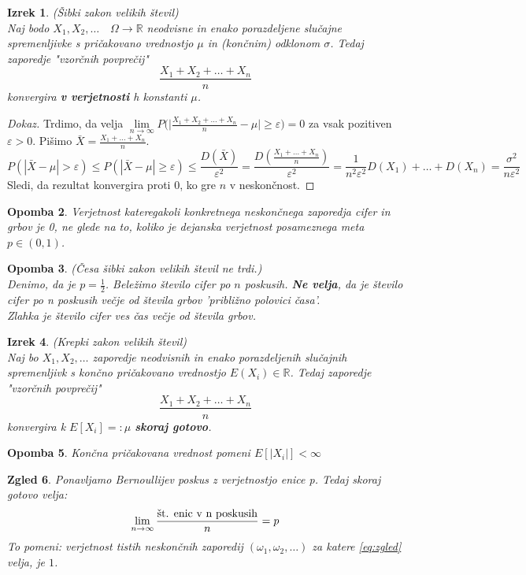 \documentclass[11pt]{article}
\newtheorem{Izrek}{{\sc Izrek}}[section]
\newtheorem{Zgled}[Izrek]{{\sc Zgled}}
\newtheorem{Opomba}[Izrek]{{\sc Opomba}}
\newenvironment{dokaz}[1][{\sc Dokaz}]{\begin{proof}[#1]\renewcommand*{\qedsymbol}{\(\blacksquare\)}}{\end{proof}}
\begin{document}
	\begin{Izrek}\label{izrek:SZVS}
	(Šibki zakon velikih števil)
	\\
	Naj bodo $X_1, X_2, \ldots \quad \Omega \to \mathbb{R}$ neodvisne in enako porazdeljene slučajne spremenljivke s pričakovano vrednostjo $\mu$ in (končnim) odklonom $\sigma$. Tedaj zaporedje "vzorčnih povprečij" 
	$$\frac{X_1 + X_2 + \ldots + X_n}{n}$$
	konvergira \textbf{v verjetnosti} h konstanti $\mu$.
	\end{Izrek}
	\begin{dokaz}
		Trdimo, da velja $\lim\limits_{n \to \infty}{P(|\frac{X_1+X_2+\ldots + X_n}{n}} - \mu| \ge \varepsilon) = 0$ za vsak pozitiven $\varepsilon > 0$. Pišimo $\bar{X} = \frac{X_1+\ldots + X_n}{n}$.
		$$P(|\bar{X} - \mu | > \varepsilon) \le P(|\bar{X} - \mu | \ge \varepsilon) \le \frac{D(\bar{X})}{\varepsilon ^2} = \frac{D(\frac{X_1+ \ldots + X_n}{n})}{\varepsilon ^2} = \frac{1}{n^2 \varepsilon ^2}D(X_1) + \ldots + D(X_n) = \frac{\sigma ^2 }{n \varepsilon ^2}$$
		Sledi, da rezultat konvergira proti $0$, ko gre $n$ v neskončnost.
	\end{dokaz}
	\begin{Opomba}
		Verjetnost kateregakoli konkretnega neskončnega zaporedja cifer in grbov je 0, ne glede na to, koliko je dejanska verjetnost posameznega meta $p\in (0,1)$.
	\end{Opomba}
	\begin{Opomba}
		(Česa šibki zakon velikih števil ne trdi.)
		\\
		Denimo, da je $p = \frac{1}{2}$. Beležimo število cifer po $n$ poskusih. \textbf{Ne velja}, da je število cifer po n poskusih večje od števila grbov 'približno polovici časa'.
		\\
		Zlahka je število cifer ves čas večje od števila grbov.
	\end{Opomba}
	\begin{Izrek}\label{izrek:KZVS}
		(Krepki zakon velikih števil)
		\\
		Naj bo $X_1, X_2, \ldots$ zaporedje neodvisnih in enako porazdeljenih slučajnih spremenljivk s končno pričakovano vrednostjo $E(X_i) \in \mathbb{R}$.
		Tedaj zaporedje "vzorčnih povprečij"
		$$\frac{X_1 + X_2 + \ldots + X_n}{n}$$
		konvergira k $E[X_i] =: \mu$ \textbf{skoraj gotovo}.
	\end{Izrek}
	\begin{Opomba}
	Končna pričakovana vrednost pomeni $E[|X_i|] < \infty$
	\end{Opomba}
	\begin{Zgled}
		Ponavljamo Bernoullijev poskus z verjetnostjo enice p. Tedaj skoraj gotovo velja:
		\begin{equation}\label{eq:zgled}
		\lim_{n\to \infty}{\frac{\textnormal{št. enic v n poskusih}}{n}} = p
		\end{equation}
		To pomeni: verjetnost tistih neskončnih zaporedij $( \omega_1, \omega_2, \ldots )$ za katere \eqref{eq:zgled} velja, je $1$.
	\end{Zgled}
\end{document}
